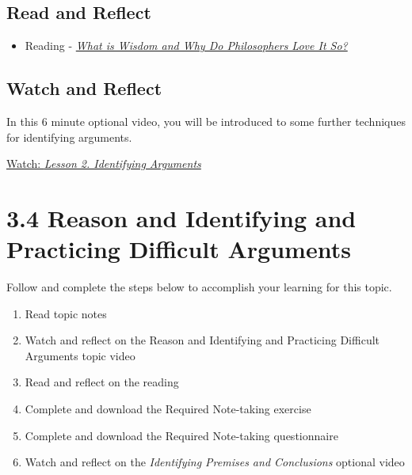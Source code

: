 \documentclass[
]{book}
\providecommand{\tightlist}{%
  \setlength{\itemsep}{0pt}\setlength{\parskip}{0pt}}
\begin{document}
\hypertarget{read-and-reflect-9}{%
\subsection*{Read and Reflect}\label{read-and-reflect-9}}

\begin{itemize}
\tightlist
\item
  Reading - \href{assets/u1/PHIL-100-Nozick-What-is-Wisdom.pdf}{\emph{What is Wisdom and Why Do Philosophers Love It So?}}
\end{itemize}

\hypertarget{watch-and-reflect-20}{%
\subsection*{Watch and Reflect}\label{watch-and-reflect-20}}

\begin{reflect}
In this 6 minute optional video, you will be introduced to some further techniques for identifying arguments.

\href{https://www.youtube.com/watch?v=lYiEj5z8le8}{Watch: \emph{Lesson 2. Identifying Arguments}}
\end{reflect}

\hypertarget{reason-and-identifying-and-practicing-difficult-arguments}{%
\section*{3.4 Reason and Identifying and Practicing Difficult Arguments}\label{reason-and-identifying-and-practicing-difficult-arguments}}

Follow and complete the steps below to accomplish your learning for this topic.

\begin{enumerate}
\def\labelenumi{\arabic{enumi}.}
\tightlist
\item
  Read topic notes
\item
  Watch and reflect on the Reason and Identifying and Practicing Difficult Arguments topic video
\item
  Read and reflect on the reading
\item
  Complete and download the Required Note-taking exercise
\item
  Complete and download the Required Note-taking questionnaire
\item
  Watch and reflect on the \emph{Identifying Premises and Conclusions} optional video
\end{enumerate}
\end{document}
